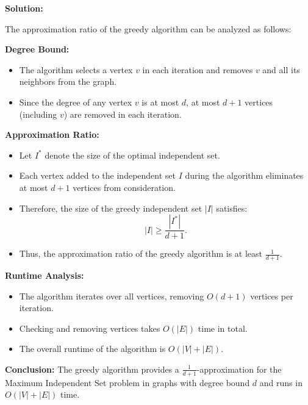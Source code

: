 \documentclass[11pt]{article}
\newenvironment{solution}{%
    \par\noindent\textbf{Solution:}\par%
}{\par}
\begin{document}
\begin{solution}
    
The approximation ratio of the greedy algorithm can be analyzed as follows:

\textbf{Degree Bound:}
\begin{itemize}
    \item The algorithm selects a vertex \( v \) in each iteration and removes \( v \) and all its neighbors from the graph.
    \item Since the degree of any vertex \( v \) is at most \( d \), at most \( d+1 \) vertices (including \( v \)) are removed in each iteration.
\end{itemize}

\textbf{Approximation Ratio:}
\begin{itemize}
    \item Let \( I^* \) denote the size of the optimal independent set.
    \item Each vertex added to the independent set \( I \) during the algorithm eliminates at most \( d+1 \) vertices from consideration.
    \item Therefore, the size of the greedy independent set \( |I| \) satisfies:
    \[
    |I| \geq \frac{|I^*|}{d+1}.
    \]
    \item Thus, the approximation ratio of the greedy algorithm is at least \( \frac{1}{d+1} \).
\end{itemize}

\textbf{Runtime Analysis:}
\begin{itemize}
    \item The algorithm iterates over all vertices, removing \( O(d+1) \) vertices per iteration.
    \item Checking and removing vertices takes \( O(|E|) \) time in total.
    \item The overall runtime of the algorithm is \( O(|V| + |E|) \).
\end{itemize}

\textbf{Conclusion:}
The greedy algorithm provides a \( \frac{1}{d+1} \)-approximation for the Maximum Independent Set problem in graphs with degree bound \( d \) and runs in \( O(|V| + |E|) \) time.
\end{solution}
\end{document}
